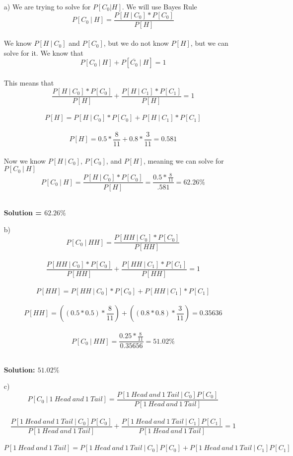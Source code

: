 \documentclass[11pt]{article}
\begin{document}
\begin{itemize}
\item[a) ] We are trying to solve for $P[C_0|H]$.  We will use Bayes Rule\\
$$ P[C_0\ |\ H] = \frac{P[H\ |\ C_0] * P[C_0]}{P[H]} $$
\\
We know $P[H\ |\ C_0]$ and $P[C_0]$, but we do not know $P[H]$, but we can solve for it. We know that
$$ P[C_0\ |\ H] + P[\overline{C_0}\ |\ H] = 1$$
\\
This means that
$$\frac{P[H\ |\ C_0] * P[C_0]}{P[H]} + \frac{P[H\ |\ C_1] * P[C_1]}{P[H]} = 1$$
\\
$$P[H] = P[H\ |\ C_0] * P[C_0] + P[H\ |\ C_1] * P[C_1]$$
\\
$$P[H] = 0.5* \frac{8}{11} + 0.8 * \frac{3}{11} = 0.581$$
\\
Now we know $P[H\ |\ C_0]$, $P[C_0]$, and $P[H]$, meaning we can solve for $P[C_0\ |\ H]$
\\
$$ P[C_0\ |\ H] = \frac{P[H\ |\ C_0] * P[C_0]}{P[H]} = \frac{0.5 * \frac{8}{11}}{.581} = 62.26\%$$\\
\begin{center}
{\Large \textbf{Solution = $62.26\%$} }
\end{center}
\newpage	
\item[b) ] 
$$ P[C_0\ |\ HH] = \frac{P[HH\ |\ C_0] * P[C_0]}{P[HH]} $$
\\
$$\frac{P[HH\ |\ C_0] * P[C_0]}{P[HH]} + \frac{P[HH\ |\ C_1] * P[C_1]}{P[HH]} = 1$$
\\
$$P[HH] = P[HH\ |\ C_0] * P[C_0] + P[HH\ |\ C_1] * P[C_1]$$
\\
$$P[HH] = ((0.5 * 0.5) * \frac{8}{11}) + ((0.8 * 0.8) * \frac{3}{11}) = 0.35636$$
\\
$$ P[C_0\ |\ HH] = \frac{0.25 * \frac{8}{11}}{0.35656} = 51.02\% $$
\\
\begin{center}
{\Large \textbf{Solution: $51.02\%$} }
\end{center}
\newpage
\item[c) ] $$ P[C_0\ |\ 1\ Head\ and\ 1\ Tail] = \frac{P[1\ Head\ and\ 1\ Tail\ |\ C_0]P[C_0]}{P[1\ Head\ and\ 1\ Tail]}$$
\\
$$ \frac{P[1\ Head\ and\ 1\ Tail\ |\ C_0]P[C_0]}{P[1\ Head\ and\ 1\ Tail]} +  \frac{P[1\ Head\ and\ 1\ Tail\ |\ C_1]P[C_1]}{P[1\ Head\ and\ 1\ Tail]} = 1$$
\\
$$P[1\ Head\ and\ 1\ Tail] = P[1\ Head\ and\ 1\ Tail\ |\ C_0]P[C_0] + P[1\ Head\ and\ 1\ Tail\ |\ C_1]P[C_1]$$
\\

\end{itemize}
\end{document}
